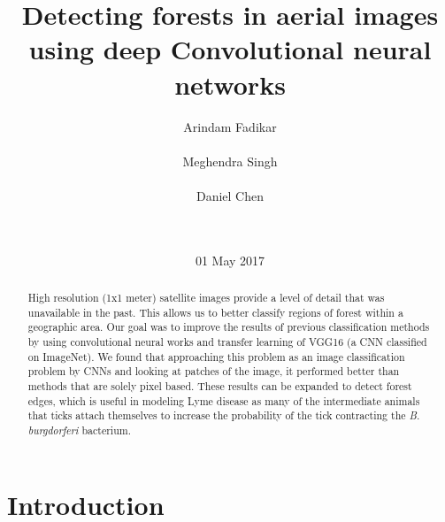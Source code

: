\documentclass{sigkddExp}
\begin{document}
\title{Detecting forests in aerial images using deep Convolutional neural networks}

\author{
\alignauthor Arindam Fadikar \\
       \\
\alignauthor Meghendra Singh\\
       \\
\alignauthor Daniel Chen\\
       \\
       \\
}

\date{01 May 2017}
\maketitle
\begin{abstract}
High resolution (1x1 meter) satellite images provide a level of detail that was unavailable in the past. This allows us to better classify regions of forest within a geographic area. Our goal was to improve the results of previous classification methods by using convolutional neural works and transfer learning of VGG16 (a CNN classified on ImageNet). We found that approaching this problem as an image classification problem by CNNs and looking at patches of the image, it performed better than methods that are solely pixel based. These results can be expanded to detect forest edges, which is useful in modeling Lyme disease as many of the intermediate animals that ticks attach themselves to increase the probability of the tick
contracting the \textit{B. burgdorferi} bacterium.
\end{abstract}

\section{Introduction}
\end{document}
